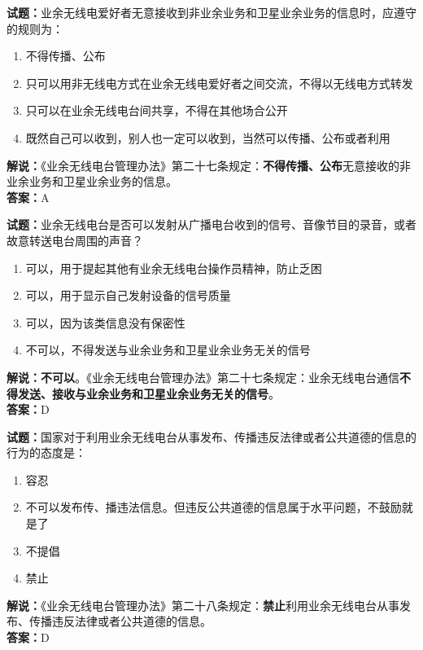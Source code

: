 \documentclass{ctexbook}
\begin{document}
\bigskip


\noindent\textbf{试题：}业余无线电爱好者无意接收到非业余业务和卫星业余业务的信息时，应遵守的规则为：
\begin{enumerate}[leftmargin=3em]
	\item 不得传播、公布
	\item 只可以用非无线电方式在业余无线电爱好者之间交流，不得以无线电方式转发
	\item 只可以在业余无线电台间共享，不得在其他场合公开
	\item 既然自己可以收到，别人也一定可以收到，当然可以传播、公布或者利用
\end{enumerate}
\noindent\textbf{解说：}《业余无线电台管理办法》第二十七条规定：\textbf{不得传播、公布}无意接收的非业余业务和卫星业余业务的信息。\\\noindent\textbf{答案：}A


\bigskip


\noindent\textbf{试题：}业余无线电台是否可以发射从广播电台收到的信号、音像节目的录音，或者故意转送电台周围的声音？
\begin{enumerate}[leftmargin=3em]
	\item 可以，用于提起其他有业余无线电台操作员精神，防止乏困
	\item 可以，用于显示自己发射设备的信号质量
	\item 可以，因为该类信息没有保密性
	\item 不可以，不得发送与业余业务和卫星业余业务无关的信号
\end{enumerate}
\textbf{解说：不可以}。《业余无线电台管理办法》第二十七条规定：业余无线电台通信\textbf{不得发送、接收与业余业务和卫星业余业务无关的信号}。\\\noindent\textbf{答案：}D



\bigskip


\noindent\textbf{试题：}国家对于利用业余无线电台从事发布、传播违反法律或者公共道德的信息的行为的态度是：
\begin{enumerate}[leftmargin=3em]
	\item 容忍
	\item 不可以发布传、播违法信息。但违反公共道德的信息属于水平问题，不鼓励就是了
	\item 不提倡
	\item 禁止
\end{enumerate}
\noindent\textbf{解说：}《业余无线电台管理办法》第二十八条规定：\textbf{禁止}利用业余无线电台从事发布、传播违反法律或者公共道德的信息。\\\noindent\textbf{答案：}D
\end{document}
